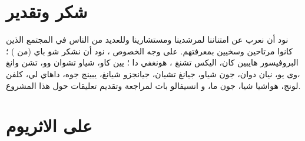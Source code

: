 \documentclass[12pt, a4paper, leqno]{report}
\theoremstyle{plain}
\theoremstyle{definition}
\begin{document}
\chapter{شكر وتقدير}
\begin{multicols}{2}
\begin{otherlanguage}{arabic}
نود أن نعرب عن امتناننا لمرشدينا ومستشارينا وللعديد من الناس في المجتمع الذين كانوا مرتاحين وسخيين بمعرفتهم. على وجه الخصوص ، نود أن   نشكر شو باي (من ) ؛ البروفيسور هايبين كان، اليكس تشنغ ، هونغفي دا ؛ يين كاو، شياو تشوان وو، تشن وانغ ،وى يو، نيان دوان، جون شياو، جيانغ تشيان، جيانجزو شيانغ، يبينج جوه، داهاي لي، كلفن لونج، هواشيا شيا، جون ما، و انسيفالو باث  لمراجعة وتقديم تعليقات حول هذا المشروع.
\end{otherlanguage}
\end{multicols}


\begin{otherlanguage}{english}


\end{otherlanguage}

\setcounter{page}{0}
\appendix
{}

\chapter{   على الاثريوم}
\end{document}
